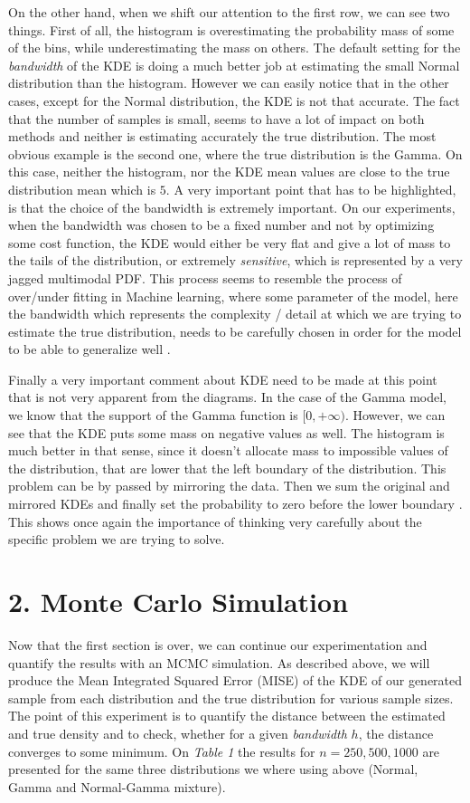 \documentclass[fleqn, a4paper]{report}
\begin{document}
On the other hand, when we shift our attention to the first row, we can see two things. First of all, the histogram is overestimating the probability mass of some of the bins, while underestimating the mass on others. The default setting for the \textit{bandwidth} of the KDE is doing a much better job at estimating the small Normal distribution than the histogram. However we can easily notice that in the other cases, except for the Normal distribution, the KDE is not that accurate. The fact that the number of samples is small, seems to have a lot of impact on both methods and neither is estimating accurately the true distribution. The most obvious example is the second one, where the true distribution is the Gamma. On this case, neither the histogram, nor the KDE mean values are close to the true distribution mean which is $5$. A very important point that has to be highlighted, is that the choice of the bandwidth is extremely important. On our experiments, when the bandwidth was chosen to be a fixed number and not by optimizing some cost function, the KDE would  either be very flat and give a lot of mass to the tails of the distribution, or extremely \textit{sensitive}, which is represented by a very jagged multimodal PDF. This process seems to resemble the process of over/under fitting in Machine learning, where some parameter of the model, here the bandwidth which represents the complexity / detail at which we are trying to estimate the true distribution, needs to be carefully chosen in order for the model to be able to generalize well \cite{murray_machine_2020}.

Finally a very important comment about KDE need to be made at this point that is not very apparent from the diagrams. In the case of the Gamma model, we know that the support of the Gamma function is $[0, +\infty)$. However, we can see that the KDE puts some mass on negative values as well. The histogram is much better in that sense, since it doesn't allocate mass to impossible values of the distribution, that are lower that the left boundary of the distribution. This problem can be by passed by mirroring the data. Then we sum the original and mirrored KDEs and finally set the probability to zero before the lower boundary \cite{kang2018kernel}. This shows once again the importance of thinking very carefully about the specific problem we are trying to solve.


\section*{2. Monte Carlo Simulation}
Now that the first section is over, we can continue our experimentation and quantify the results with an MCMC simulation. As described above, we will produce the Mean Integrated Squared Error (MISE) of the KDE of our generated sample from each distribution and the true distribution for various sample sizes. The point of this experiment is to quantify the distance between the estimated and true density and to check, whether for a given \textit{bandwidth} $h$, the distance converges to some minimum. On \textit{Table 1} the results for $n=250,500,1000$ are presented for the same three distributions we where using above (Normal, Gamma and Normal-Gamma mixture). 
\end{document}
